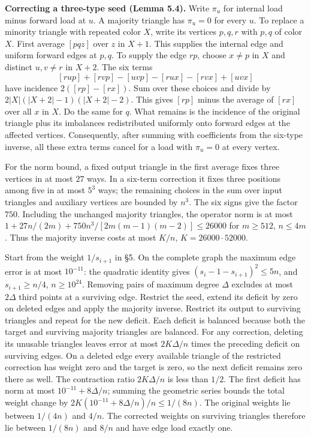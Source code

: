 \documentclass[english,11pt,a4paper]{article}
\begin{document}
\textbf{Correcting a three-type seed (Lemma 5.4).} Write \(\pi_u\) for internal load minus forward load at \(u\). A majority triangle has \(\pi_u=0\) for every \(u\). To replace a minority triangle with repeated color \(X\), write its vertices \(p,q,r\) with \(p,q\) of color \(X\). First average \([pqz]\) over \(z\) in \(X+1\). This supplies the internal edge and uniform forward edges at \(p,q\). To supply the edge \(rp\), choose \(x\ne p\) in \(X\) and distinct \(u,v\ne r\) in \(X+2\). The six terms \[[rup]+[rvp]-[uvp]-[rux]-[rvx]+[uvx]\] have incidence \(2([rp]-[rx])\). Sum over these choices and divide by \(2|X|(|X+2|-1)(|X+2|-2)\). This gives \([rp]\) minus the average of \([rx]\) over all \(x\) in \(X\). Do the same for \(q\). What remains is the incidence of the original triangle plus its imbalances redistributed uniformly onto forward edges at the affected vertices. Consequently, after summing with coefficients from the six-type inverse, all these extra terms cancel for a load with \(\pi_u=0\) at every vertex.

For the norm bound, a fixed output triangle in the first average fixes three vertices in at most \(27\) ways. In a six-term correction it fixes three positions among five in at most \(5^3\) ways; the remaining choices in the sum over input triangles and auxiliary vertices are bounded by \(n^3\). The six signs give the factor \(750\). Including the unchanged majority triangles, the operator norm is at most \(1+27n/(2m)+750n^3/[2m(m-1)(m-2)]\le26000\) for \(m\ge512\), \(n\le4m\). Thus the majority inverse costs at most \(K/n\), \(K=26000\cdot52000\).

Start from the weight \(1/s_{i+1}\) in §5. On the complete graph the maximum edge error is at most \(10^{-11}\): the quadratic identity gives \((s_i-1-s_{i+1})^2\le5n\), and \(s_{i+1}\ge n/4\), \(n\ge10^{24}\). Removing pairs of maximum degree \(\Delta\) excludes at most \(2\Delta\) third points at a surviving edge. Restrict the seed, extend its deficit by zero on deleted edges and apply the majority inverse. Restrict its output to surviving triangles and repeat for the new deficit. Each deficit is balanced because both the target and surviving majority triangles are balanced. For any correction, deleting its unusable triangles leaves error at most \(2K\Delta/n\) times the preceding deficit on surviving edges. On a deleted edge every available triangle of the restricted correction has weight zero and the target is zero, so the next deficit remains zero there as well. The contraction ratio \(2K\Delta/n\) is less than \(1/2\). The first deficit has norm at most \(10^{-11}+8\Delta/n\); summing the geometric series bounds the total weight change by \(2K(10^{-11}+8\Delta/n)/n\le1/(8n)\). The original weights lie between \(1/(4n)\) and \(4/n\). The corrected weights on surviving triangles therefore lie between \(1/(8n)\) and \(8/n\) and have edge load exactly one.
\end{document}
